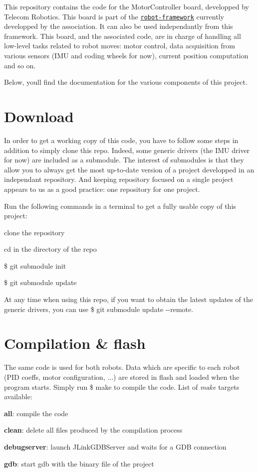 This repository contains the code for the Motor\+Controller board, developped by Telecom Robotics. This board is part of the \href{https://github.com/TelecomParistoc/robot-framework}{\tt robot-\/framework} currently developped by the association. It can also be used independantly from this framework. This board, and the associated code, are in charge of handling all low-\/level tasks related to robot moves\+: motor control, data acquisition from various sensors (I\+MU and coding wheels for now), current position computation and so on.

Below, you\textquotesingle{}ll find the documentation for the various components of this project.

\section*{Download}

In order to get a working copy of this code, you have to follow some steps in addition to simply clone this repo. Indeed, some generic drivers (the I\+MU driver for now) are included as a submodule. The interest of submodules is that they allow you to always get the most up-\/to-\/date version of a project developped in an independant repository. And keeping repository focused on a single project appears to us as a good practice\+: one repository for one project.

Run the following commands in a terminal to get a fully usable copy of this project\+:
\begin{DoxyItemize}
\item clone the repository
\item cd in the directory of the repo
\item {\ttfamily \$ git submodule init}
\item {\ttfamily \$ git submodule update}
\end{DoxyItemize}

At any time when using this repo, if you want to obtain the latest updates of the generic drivers, you can use {\ttfamily \$ git submodule update -\/-\/remote}.

\section*{Compilation \& flash}

The same code is used for both robots. Data which are specific to each robot (P\+ID coeffs, motor configuration, ...) are stored in flash and loaded when the program starts. Simply run {\ttfamily \$ make} to compile the code. List of {\itshape make} targets available\+:
\begin{DoxyItemize}
\item {\bfseries all}\+: compile the code
\item {\bfseries clean}\+: delete all files produced by the compilation process
\item {\bfseries debugserver}\+: launch J\+Link\+G\+D\+B\+Server and waits for a G\+DB connection
\item {\bfseries gdb}\+: start gdb with the binary file of the project
\end{DoxyItemize}

